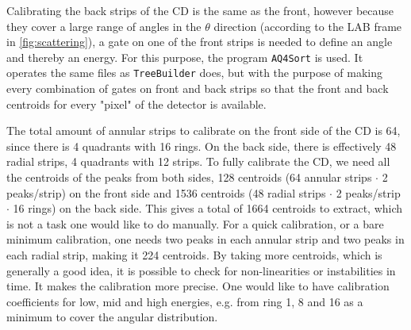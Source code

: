 \documentclass[twoside,english]{uiofysmaster/uiofysmaster}
\let\orgautoref\autoref
\renewcommand{\autoref}
        {%
		 \def\sectionautorefname{Section}%
		 \def\subsectionautorefname{Section}%
		 \def\subsubsectionautorefname{Section}%
		 \def\chapterautorefname{Chapter}%
          \orgautoref}
\begin{document}
Calibrating the back strips of the CD is the same as the front, however because they cover a large range of angles in the $\theta$ direction (according to the LAB frame in \autoref{fig:scattering}), a gate on one of the front strips is needed to define an angle and thereby an energy. 
For this purpose, the program \texttt{AQ4Sort} is used. 
It operates the same files as \texttt{TreeBuilder} does, but with the purpose of making every combination of gates on front and back strips so that the front and back centroids for every "pixel" of the detector is available.

The total amount of annular strips to calibrate on the front side of the CD is 64, since there is 4 quadrants with 16 rings. 
On the back side, there is effectively 48 radial strips, 4 quadrants with 12 strips.
To fully calibrate the CD, we need all the centroids of the peaks from both sides, 128 centroids (64 annular strips $\cdot$ 2 peaks/strip) on the front side and 1536 centroids (48 radial strips $\cdot$ 2 peaks/strip $\cdot$ 16 rings) on the back side. 
This gives a total of 1664 centroids to extract, which is not a task one would like to do manually.
For a quick calibration, or a bare minimum calibration, one needs two peaks in each annular strip and two peaks in each radial strip, making it 224 centroids.
By taking more centroids, which is generally a good idea, it is possible to check for non-linearities or instabilities in time.
It makes the calibration more precise.
One would like to have calibration coefficients for low, mid and high energies, e.g. from ring 1, 8 and 16 as a minimum to cover the angular distribution.
\end{document}
